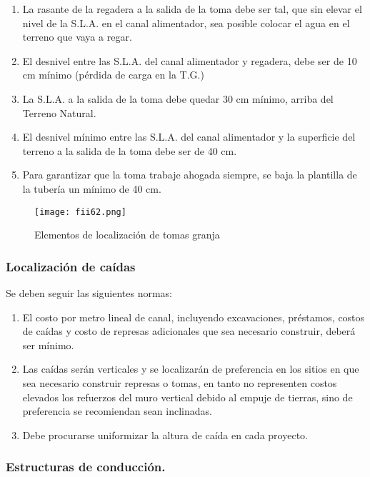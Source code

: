 \begin{enumerate}
	\item La rasante de la regadera a la salida de la toma debe ser tal, que sin elevar el
	      nivel de la S.L.A. en el canal alimentador, sea posible colocar el agua en el terreno
	      que vaya a regar.
	\item  El desnivel entre las S.L.A. del canal alimentador y regadera, debe ser de 10
	      cm mínimo (pérdida de carga en la T.G.)
	\item  La S.L.A. a la salida de la toma debe quedar 30 cm mínimo, arriba del Terreno
	      Natural.
	\item El desnivel mínimo entre las S.L.A. del canal alimentador y la superficie del
	      terreno a la salida de la toma debe ser de 40 cm.
	\item Para garantizar que la toma trabaje ahogada siempre, se baja la plantilla de la
	      tubería un mínimo de 40 cm.
\end{enumerate}

\begin{figure}[h!]
	\centerline{\texttt{[image: fii62.png]}}
	\caption{Elementos de localización de tomas granja}
	\label{fii62}
\end{figure}

\subsubsection{Localización de caídas}

Se deben seguir las siguientes normas:

\begin{enumerate}
	\item El costo por metro lineal de canal, incluyendo excavaciones, préstamos,
	      costos de caídas y costo de represas adicionales que sea necesario construir, deberá
	      ser mínimo.
	\item Las caídas serán verticales y se localizarán de preferencia en los sitios en que
	      sea necesario construir represas o tomas, en tanto no representen costos elevados los
	      refuerzos del muro vertical debido al empuje de tierras, sino de preferencia se
	      recomiendan sean inclinadas.
	\item Debe procurarse uniformizar la altura de caída en cada proyecto.
\end{enumerate}

\subsubsection{Estructuras de conducción.}

